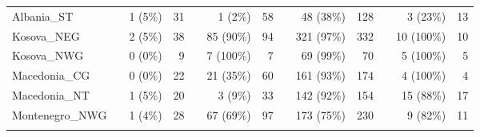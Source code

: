 \documentclass[output=paper]{langsci/langscibook}
\begin{document}
\begin{sidewaystable}
\begin{tabular}{lcrrcrrcrrcrr}
Albania\_ST     &                    & 1 (5\%)                  & 31                                 &                    & 1 (2\%)                  & 58                                 &                    & 48 (38\%)                & 128                                &                    & 3 (23\%)                 & 13                                 \\
Kosova\_NEG     &                    & 2 (5\%)                  & 38                                 &                    & 85 (90\%)                & 94                                 &                    & 321 (97\%)               & 332                                &                    & 10 (100\%)               & 10                                 \\
Kosova\_NWG     &                    & 0 (0\%)                  & 9                                  &                    & 7 (100\%)                & 7                                  &                    & 69 (99\%)                & 70                                 &                    & 5 (100\%)                & 5                                  \\
Macedonia\_CG   &                    & 0 (0\%)                  & 22                                 &                    & 21 (35\%)                & 60                                 &                    & 161 (93\%)               & 174                                &                    & 4 (100\%)                & 4                                  \\
Macedonia\_NT   &                    & 1 (5\%)                  & 20                                 &                    & 3 (9\%)                  & 33                                 &                    & 142 (92\%)               & 154                                &                    & 15 (88\%)                & 17                                 \\
Montenegro\_NWG &                    & 1 (4\%)                  & 28                                 &                    & 67 (69\%)                & 97                                 &                    & 173 (75\%)               & 230                                &                    & 9 (82\%)                 & 11                                \\
\lspbottomrule
\end{tabular}
\end{sidewaystable}
\end{document}
